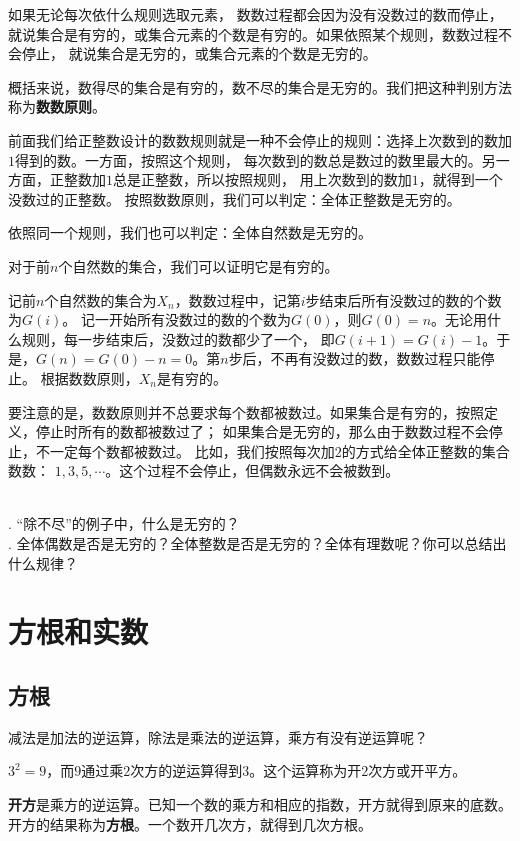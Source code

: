 \documentclass[12pt,UTF8]{ctexbook}
\begin{document}
如果无论每次依什么规则选取元素，
数数过程都会因为没有没数过的数而停止，就说集合是有穷的，或集合元素的个数是有穷的。如果依照某个规则，数数过程不会停止，
就说集合是无穷的，或集合元素的个数是无穷的。

概括来说，数得尽的集合是有穷的，数不尽的集合是无穷的。我们把这种判别方法称为\textbf{数数原则}。

前面我们给正整数设计的数数规则就是一种不会停止的规则：选择上次数到的数加$1$得到的数。一方面，按照这个规则，
每次数到的数总是数过的数里最大的。另一方面，正整数加$1$总是正整数，所以按照规则，
用上次数到的数加$1$，就得到一个没数过的正整数。
按照数数原则，我们可以判定：全体正整数是无穷的。

依照同一个规则，我们也可以判定：全体自然数是无穷的。

对于前$n$个自然数的集合，我们可以证明它是有穷的。

记前$n$个自然数的集合为$X_n$，数数过程中，记第$i$步结束后所有没数过的数的个数为$G(i)$。
记一开始所有没数过的数的个数为$G(0)$，则$G(0) = n$。无论用什么规则，每一步结束后，没数过的数都少了一个，
即$G(i+1) = G(i) - 1$。于是，$G(n) = G(0) - n = 0$。第$n$步后，不再有没数过的数，数数过程只能停止。
根据数数原则，$X_n$是有穷的。

要注意的是，数数原则并不总要求每个数都被数过。如果集合是有穷的，按照定义，停止时所有的数都被数过了；
如果集合是无穷的，那么由于数数过程不会停止，不一定每个数都被数过。
比如，我们按照每次加$2$的方式给全体正整数的集合数数：
$1,3,5,\cdots$。这个过程不会停止，但偶数永远不会被数到。

\begin{sk}
    \mbox{}\\
    . “除不尽”的例子中，什么是无穷的？\\
    . 全体偶数是否是无穷的？全体整数是否是无穷的？全体有理数呢？你可以总结出什么规律？
\end{sk}

\chapter{方根和实数}

\section{方根}
减法是加法的逆运算，除法是乘法的逆运算，乘方有没有逆运算呢？

$3^2 = 9$，而$9$通过乘$2$次方的逆运算得到$3$。这个运算称为开$2$次方或开平方。

\textbf{开方}是乘方的逆运算。已知一个数的乘方和相应的指数，开方就得到原来的底数。
开方的结果称为\textbf{方根}。一个数开几次方，就得到几次方根。
\end{document}
